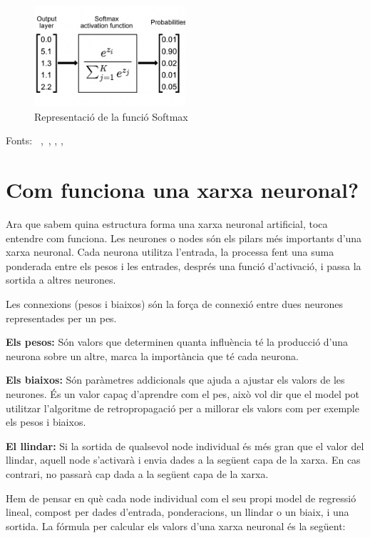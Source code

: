 \begin{enumerate}
    \begin{figure}[H]
        \centering
        \includegraphics[width=0.5\textwidth]{./figures/representacio_Softmax.png}
        \caption{Representació de la funció Softmax}
    \end{figure}
\end{enumerate}

Fonts: ~\cite{Hidden_layer},~\cite{Jacar}, \cite{FuncioD'activació}, \cite{Softmax}, \cite{datacamp}

\section{Com funciona una xarxa neuronal?}\label{sec:3.8}

Ara que sabem quina estructura forma una xarxa neuronal artificial, toca entendre com funciona. Les neurones o nodes són els pilars més importants d'una xarxa neuronal. Cada neurona utilitza l'entrada, la processa fent una suma ponderada entre els pesos i les entrades, després una funció d'activació, i passa la sortida a altres neurones.

Les connexions (pesos i biaixos) són la força de connexió entre dues neurones representades per un pes.

\textbf{Els pesos:} Són valors que determinen quanta influència té la producció d'una neurona sobre un altre, marca la importància que té cada neurona.

\textbf{Els biaixos:} Són paràmetres addicionals que ajuda a ajustar els valors de les neurones. És un valor capaç d'aprendre com el pes, això vol dir que el model pot utilitzar l'algoritme de retropropagació per a millorar els valors com per exemple els pesos i biaixos.

\textbf{El llindar:} Si la sortida de qualsevol node individual és més gran que el valor del llindar, aquell node s'activarà i envia dades a la següent capa de la xarxa. En cas contrari, no passarà cap dada a la següent capa de la xarxa.

Hem de pensar en què cada node individual com el seu propi model de regressió lineal, compost per dades d'entrada, ponderacions, un llindar o un biaix, i una sortida. La fórmula per calcular els valors d'una xarxa neuronal és la següent:

